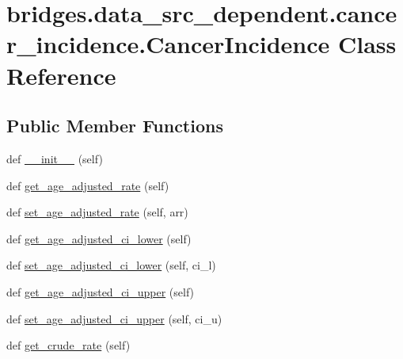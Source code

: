 \hypertarget{classbridges_1_1data__src__dependent_1_1cancer__incidence_1_1_cancer_incidence}{}\section{bridges.\+data\+\_\+src\+\_\+dependent.\+cancer\+\_\+incidence.\+Cancer\+Incidence Class Reference}
\label{classbridges_1_1data__src__dependent_1_1cancer__incidence_1_1_cancer_incidence}
\subsection*{Public Member Functions}
\begin{DoxyCompactItemize}
\item 
def \hyperlink{classbridges_1_1data__src__dependent_1_1cancer__incidence_1_1_cancer_incidence_a14ca87e4a6a0c2f394c46f0980ac922c}{\+\_\+\+\_\+init\+\_\+\+\_\+} (self)
\item 
def \hyperlink{classbridges_1_1data__src__dependent_1_1cancer__incidence_1_1_cancer_incidence_a8f679189f9811d6f5c43503f95d87666}{get\+\_\+age\+\_\+adjusted\+\_\+rate} (self)
\item 
def \hyperlink{classbridges_1_1data__src__dependent_1_1cancer__incidence_1_1_cancer_incidence_a437897ce848c5deec32b7c8eafc1ff68}{set\+\_\+age\+\_\+adjusted\+\_\+rate} (self, arr)
\item 
def \hyperlink{classbridges_1_1data__src__dependent_1_1cancer__incidence_1_1_cancer_incidence_ae567ee5ec0334912272652eaed74f838}{get\+\_\+age\+\_\+adjusted\+\_\+ci\+\_\+lower} (self)
\item 
def \hyperlink{classbridges_1_1data__src__dependent_1_1cancer__incidence_1_1_cancer_incidence_a846cee6b8db4c47c6f08aca463886351}{set\+\_\+age\+\_\+adjusted\+\_\+ci\+\_\+lower} (self, ci\+\_\+l)
\item 
def \hyperlink{classbridges_1_1data__src__dependent_1_1cancer__incidence_1_1_cancer_incidence_a0530a49e935e90b6ca0fe1c1d31f937b}{get\+\_\+age\+\_\+adjusted\+\_\+ci\+\_\+upper} (self)
\item 
def \hyperlink{classbridges_1_1data__src__dependent_1_1cancer__incidence_1_1_cancer_incidence_abed4a78c4e51559d19c1c5dfaadb2bc8}{set\+\_\+age\+\_\+adjusted\+\_\+ci\+\_\+upper} (self, ci\+\_\+u)
\item 
def \hyperlink{classbridges_1_1data__src__dependent_1_1cancer__incidence_1_1_cancer_incidence_a8ba4f50886eaeac0c7f40c3de1555ba5}{get\+\_\+crude\+\_\+rate} (self)

\end{DoxyCompactItemize}
